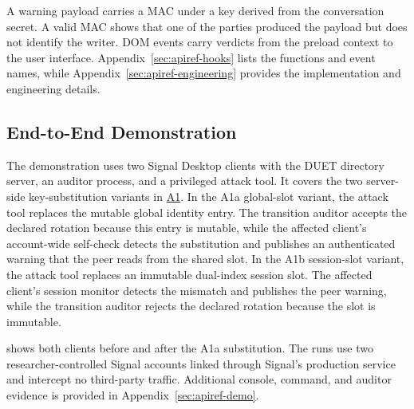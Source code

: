 A warning payload carries a MAC under a key derived from the conversation secret. A valid MAC shows
that one of the parties produced the payload but does not identify the writer. DOM events carry
verdicts from the preload context to the user interface. Appendix~\ref{sec:apiref-hooks} lists the functions and
event names, while Appendix~\ref{sec:apiref-engineering} provides the implementation and engineering
details.

\subsection{End-to-End Demonstration}\label{ssec:impl-demo}

The demonstration uses two Signal Desktop clients with the DUET directory server, an auditor process,
and a privileged attack tool. It covers the two server-side key-substitution variants in
\hyperref[sc:threat-a1]{A1}. In the A1a global-slot variant, the attack tool replaces the mutable
global identity entry. The transition auditor accepts the declared rotation because this entry is
mutable, while the affected client's account-wide self-check detects the substitution and publishes
an authenticated warning that the peer reads from the shared slot. In the A1b session-slot variant,
the attack tool replaces an immutable dual-index session slot. The affected client's session monitor
detects the mismatch and publishes the peer warning, while the transition auditor rejects the
declared rotation because the slot is immutable.

 shows both clients before and after the A1a substitution. The runs use two
researcher-controlled Signal accounts linked through Signal's production service and intercept no
third-party traffic. Additional console, command, and auditor evidence is provided in
Appendix~\ref{sec:apiref-demo}.

